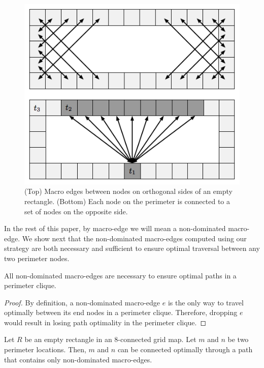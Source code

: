\begin{figure}[tb]
       \begin{center}
		   \includegraphics[scale=0.45, trim = 10mm 10mm 10mm 0mm]
			{diagrams/macroedges.png}
       \end{center}
	\vspace{-3pt}
       \caption{(Top) Macro edges between nodes on orthogonal sides of an empty
       rectangle. (Bottom) Each node on the perimeter is connected to a set of 
		nodes on the opposite side.}
       \label{fig-macroedges}
\end{figure}

In the rest of this paper, by macro-edge we will mean a non-dominated macro-edge.
We show next that the non-dominated macro-edges computed using our strategy are both
necessary and sufficient to ensure optimal traversal between any two perimeter
nodes.

\begin{proposition} All non-dominated macro-edges are necessary to ensure
optimal paths in a perimeter clique.  
\end{proposition} 
\begin{proof} By
definition, a non-dominated macro-edge $e$ is the only way to travel optimally
between its end nodes in a perimeter clique. Therefore, dropping $e$ would
result in losing path optimality in the perimeter clique.  
\end{proof}

\begin{lemma} \label{lemma-rooms} Let $R$ be an empty rectangle in
an 8-connected grid map. Let $m$ and $n$ be two perimeter locations.
Then, $m$ and $n$ can be connected optimally through a path that
contains only non-dominated macro-edges.
\end{lemma}

